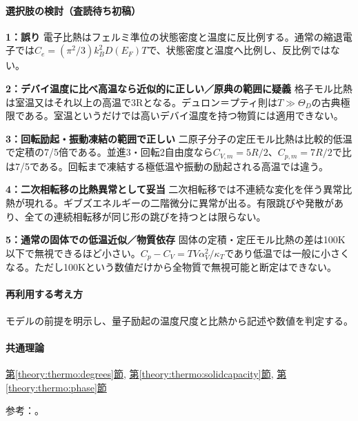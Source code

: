 \paragraph{選択肢の検討（査読待ち初稿）}\mbox{}\par

\noindent\textbf{1：誤り} 電子比熱はフェルミ準位の状態密度と温度に反比例する。通常の縮退電子では\(C_e=(\pi^2/3)k_B^2D(E_F)T\)で、状態密度と温度へ比例し、反比例ではない。\par

\noindent\textbf{2：デバイ温度に比べ高温なら近似的に正しい／原典の範囲に疑義} 格子モル比熱は室温又はそれ以上の高温で3Rとなる。デュロン＝プティ則は\(T\gg\Theta_D\)の古典極限である。室温というだけでは高いデバイ温度を持つ物質には適用できない。\par

\noindent\textbf{3：回転励起・振動凍結の範囲で正しい} 二原子分子の定圧モル比熱は比較的低温で定積の7/5倍である。並進3・回転2自由度なら\(C_{V,m}=5R/2\)、\(C_{p,m}=7R/2\)で比は7/5である。回転まで凍結する極低温や振動の励起される高温では違う。\par

\noindent\textbf{4：二次相転移の比熱異常として妥当} 二次相転移では不連続な変化を伴う異常比熱が現れる。ギブズエネルギーの二階微分に異常が出る。有限跳びや発散があり、全ての連続相転移が同じ形の跳びを持つとは限らない。\par

\noindent\textbf{5：通常の固体での低温近似／物質依存} 固体の定積・定圧モル比熱の差は100K以下で無視できるほど小さい。\(C_p-C_V=TV\alpha_V^2/\kappa_T\)であり低温では一般に小さくなる。ただし100Kという数値だけから全物質で無視可能と断定はできない。\par

\paragraph{再利用する考え方} モデルの前提を明示し、量子励起の温度尺度と比熱から記述や数値を判定する。

\paragraph{共通理論} \hyperref[theory:thermo:degrees]{第\ref*{theory:thermo:degrees}節}, \hyperref[theory:thermo:solidcapacity]{第\ref*{theory:thermo:solidcapacity}節}, \hyperref[theory:thermo:phase]{第\ref*{theory:thermo:phase}節}

\par 参考：\cite{mit_electronic_heat2012,mit_debye2005}。

